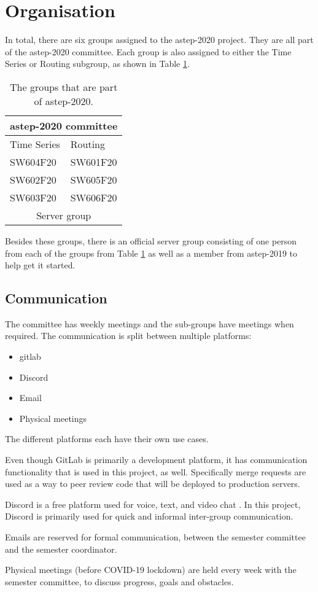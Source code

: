\section{Organisation}
In total, there are six groups assigned to the \gls{astep}-2020 project. They are all part of the \gls{astep}-2020 committee. Each group is also assigned to either the Time Series or Routing subgroup, as shown in Table \ref{tab:org}.

\bgroup
\def\arraystretch{1.8}
\begin{table}[htbp]
    \centering
    \begin{tabular}{|l|l|}
        \hline
        \multicolumn{2}{|c|}{astep-2020 committee} \\ \hline
        Time Series           & Routing            \\ \hline
        SW604F20              & SW601F20           \\ \hline
        SW602F20              & SW605F20           \\ \hline
        SW603F20              & SW606F20           \\ \hline
        \multicolumn{2}{|c|}{Server group}         \\ \hline
    \end{tabular}
    \caption{The groups that are part of \gls{astep}-2020.}
    \label{tab:org}
\end{table}
\egroup

\noindent
Besides these groups, there is an official server group consisting of one person from each of the groups from Table \ref{tab:org} as well as a member from \gls{astep}-2019 to help get it started.

\subsection{Communication}
The committee has weekly meetings and the sub-groups have meetings when required.
The communication is split between multiple platforms:
\begin{itemize}
    \item \Gls{gitlab}
    \item Discord
    \item Email
    \item Physical meetings
\end{itemize}
\noindent
The different platforms each have their own use cases.

Even though GitLab is primarily a development platform, it has communication functionality that is used in this project, as well. Specifically merge requests are used as a way to peer review code that will be deployed to production servers.\cite{gitlab}

Discord is a free platform used for voice, text, and video chat \cite{discord}. In this project, Discord is primarily used for quick and informal inter-group communication.

Emails are reserved for formal communication, between the semester committee and the semester coordinator.

Physical meetings (before COVID-19 lockdown) are held every week with the semester committee, to discuss progress, goals and obstacles.

